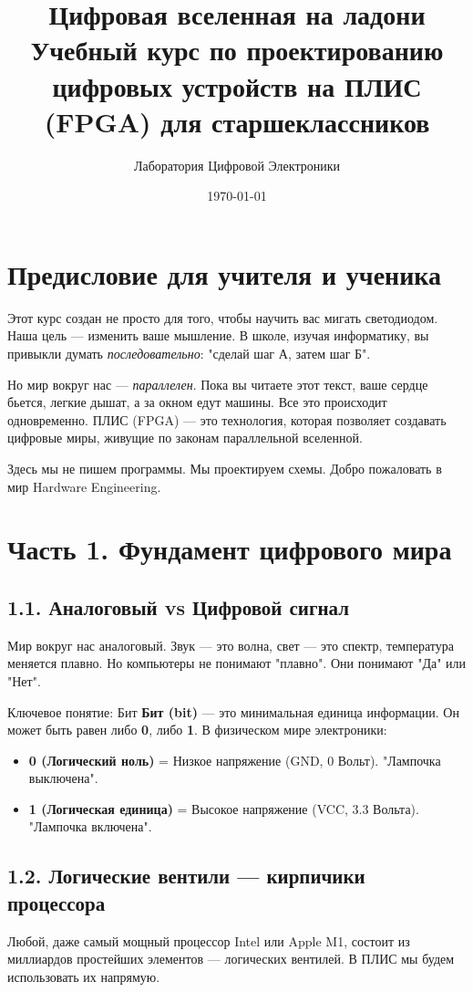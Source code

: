 \documentclass[12pt, a4paper]{article}
\title{\textbf{Цифровая вселенная на ладони}\\ \large Учебный курс по проектированию цифровых устройств на ПЛИС (FPGA) для старшеклассников}
\author{Лаборатория Цифровой Электроники}
\date{\today}
\begin{document}
\maketitle
\tableofcontents
\newpage

\section{Предисловие для учителя и ученика}
Этот курс создан не просто для того, чтобы научить вас мигать светодиодом. Наша цель — изменить ваше мышление. В школе, изучая информатику, вы привыкли думать \textit{последовательно}: "сделай шаг А, затем шаг Б". 

Но мир вокруг нас — \textit{параллелен}. Пока вы читаете этот текст, ваше сердце бьется, легкие дышат, а за окном едут машины. Все это происходит одновременно. ПЛИС (FPGA) — это технология, которая позволяет создавать цифровые миры, живущие по законам параллельной вселенной.

Здесь мы не пишем программы. Мы проектируем схемы. Добро пожаловать в мир Hardware Engineering.

\newpage

\section{Часть 1. Фундамент цифрового мира}

\subsection{1.1. Аналоговый vs Цифровой сигнал}
Мир вокруг нас аналоговый. Звук — это волна, свет — это спектр, температура меняется плавно. Но компьютеры не понимают "плавно". Они понимают "Да" или "Нет".

\begin{info}{Ключевое понятие: Бит}
\textbf{Бит (bit)} — это минимальная единица информации. Он может быть равен либо \textbf{0}, либо \textbf{1}.
В физическом мире электроники:
\begin{itemize}
    \item \textbf{0 (Логический ноль)} = Низкое напряжение (GND, 0 Вольт). "Лампочка выключена".
    \item \textbf{1 (Логическая единица)} = Высокое напряжение (VCC, 3.3 Вольта). "Лампочка включена".
\end{itemize}
\end{info}

\subsection{1.2. Логические вентили — кирпичики процессора}
Любой, даже самый мощный процессор Intel или Apple M1, состоит из миллиардов простейших элементов — логических вентилей. В ПЛИС мы будем использовать их напрямую.
\end{document}
